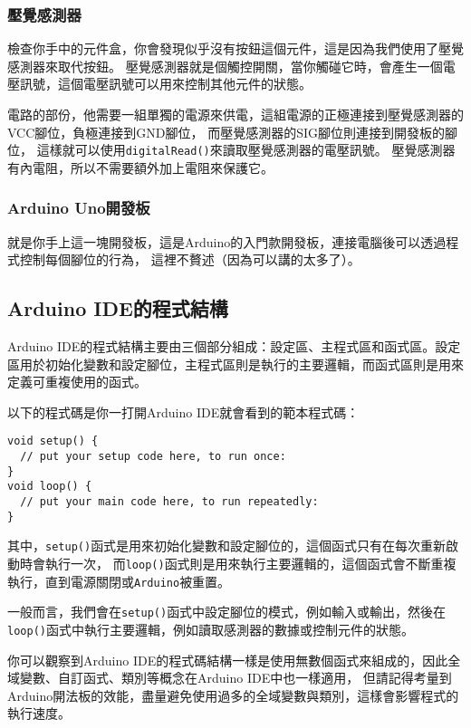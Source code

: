 \documentclass[12pt,a4paper]{article}
\begin{document}
\subsubsection{壓覺感測器}

檢查你手中的元件盒，你會發現似乎沒有按鈕這個元件，這是因為我們使用了壓覺感測器來取代按鈕。
壓覺感測器就是個觸控開關，當你觸碰它時，會產生一個電壓訊號，這個電壓訊號可以用來控制其他元件的狀態。

電路的部份，他需要一組單獨的電源來供電，這組電源的正極連接到壓覺感測器的VCC腳位，負極連接到GND腳位，
而壓覺感測器的SIG腳位則連接到開發板的腳位，
這樣就可以使用\texttt{digitalRead()}來讀取壓覺感測器的電壓訊號。
壓覺感測器有內電阻，所以不需要額外加上電阻來保護它。

\subsubsection{Arduino Uno開發板}
就是你手上這一塊開發板，這是Arduino的入門款開發板，連接電腦後可以透過程式控制每個腳位的行為，
這裡不贅述（因為可以講的太多了）。



\subsection{Arduino IDE的程式結構}
Arduino IDE的程式結構主要由三個部分組成：設定區、主程式區和函式區。設定區用於初始化變數和設定腳位，主程式區則是執行的主要邏輯，而函式區則是用來定義可重複使用的函式。

以下的程式碼是你一打開Arduino IDE就會看到的範本程式碼：
\begin{lstlisting}
void setup() {
  // put your setup code here, to run once:
}
void loop() {
  // put your main code here, to run repeatedly:
}
\end{lstlisting}

其中，\texttt{setup()}函式是用來初始化變數和設定腳位的，這個函式只有在每次重新啟動時會執行一次，
而\texttt{loop()}函式則是用來執行主要邏輯的，這個函式會不斷重複執行，直到電源關閉或\texttt{Arduino}被重置。

一般而言，我們會在\texttt{setup()}函式中設定腳位的模式，例如輸入或輸出，然後在\texttt{loop()}函式中執行主要邏輯，例如讀取感測器的數據或控制元件的狀態。

你可以觀察到Arduino IDE的程式碼結構一樣是使用無數個函式來組成的，因此全域變數、自訂函式、類別等概念在Arduino IDE中也一樣適用，
但請記得考量到Arduino開法板的效能，盡量避免使用過多的全域變數與類別，這樣會影響程式的執行速度。
\end{document}
